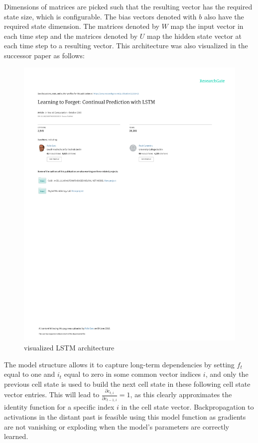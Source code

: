 \documentclass[draft,final]{vutinfth} %
\begin{document}
    Dimensions of matrices are picked such that the resulting vector has the required state size, which is configurable.
    The bias vectors denoted with $b$ also have the required state dimension.
    The matrices denoted by $W$ map the input vector in each time step and the matrices denoted by $U$ map the hidden state vector at each time step to a resulting vector.
    This architecture was also visualized in the successor paper as follows:
    \begin{figure}[H]
        \centering{}
        \includegraphics[page=6,width=0.8\linewidth,trim={175 535 200 55},clip]{literature/learning_to_forget_continual_prediction_with_lstm.pdf}
        \caption{visualized LSTM architecture \cite[p. 6]{LSTM_forget}}
        \label{fig:lstm_vis}
    \end{figure}
    The model structure allows it to capture long-term dependencies by setting $f_t$ equal to one and $i_t$ equal to zero in some common vector indices $i$, and only the previous cell state is used to build the next cell state in these following cell state vector entries.
    This will lead to $\frac{\partial{c_{t,i}}}{\partial{c_{t-1,i}}} = 1$, as this clearly approximates the identity function for a specific index $i$ in the cell state vector.
    Backpropagation to activations in the distant past is feasible using this model function as gradients are not vanishing or exploding when the model's parameters are correctly learned.
\end{document}
